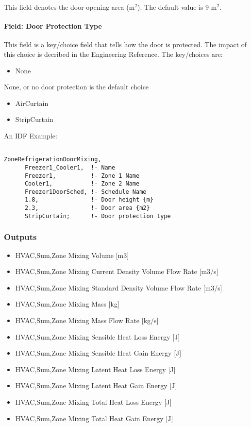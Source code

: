 This field denotes the door opening area (m\(^{2}\)). The default value is 9 m\(^{2}\).

\paragraph{Field: Door Protection Type}\label{field-door-protection-type}

This field is a key/choice field that tells how the door is protected. The impact of this choice is decribed in the Engineering Reference. The key/choices are:

\begin{itemize}
\tightlist
\item
  None
\end{itemize}

None, or no door protection is the default choice

\begin{itemize}
\item
  AirCurtain
\item
  StripCurtain
\end{itemize}

An IDF Example:

\begin{lstlisting}

ZoneRefrigerationDoorMixing,
      Freezer1_Cooler1,  !- Name
      Freezer1,          !- Zone 1 Name
      Cooler1,           !- Zone 2 Name
      Freezer1DoorSched, !- Schedule Name
      1.8,               !- Door height {m}
      2.3,               !- Door area {m2}
      StripCurtain;      !- Door protection type
\end{lstlisting}

\subsubsection{Outputs}\label{outputs-5-000}

\begin{itemize}
\item
  HVAC,Sum,Zone Mixing Volume {[}m3{]}
\item
  HVAC,Sum,Zone Mixing Current Density Volume Flow Rate {[}m3/s{]}
\item
  HVAC,Sum,Zone Mixing Standard Density Volume Flow Rate {[}m3/s{]}
\item
  HVAC,Sum,Zone Mixing Mass {[}kg{]}
\item
  HVAC,Sum,Zone Mixing Mass Flow Rate {[}kg/s{]}
\item
  HVAC,Sum,Zone Mixing Sensible Heat Loss Energy {[}J{]}
\item
  HVAC,Sum,Zone Mixing Sensible Heat Gain Energy {[}J{]}
\item
  HVAC,Sum,Zone Mixing Latent Heat Loss Energy {[}J{]}
\item
  HVAC,Sum,Zone Mixing Latent Heat Gain Energy {[}J{]}
\item
  HVAC,Sum,Zone Mixing Total Heat Loss Energy {[}J{]}
\item
  HVAC,Sum,Zone Mixing Total Heat Gain Energy {[}J{]}
\end{itemize}

